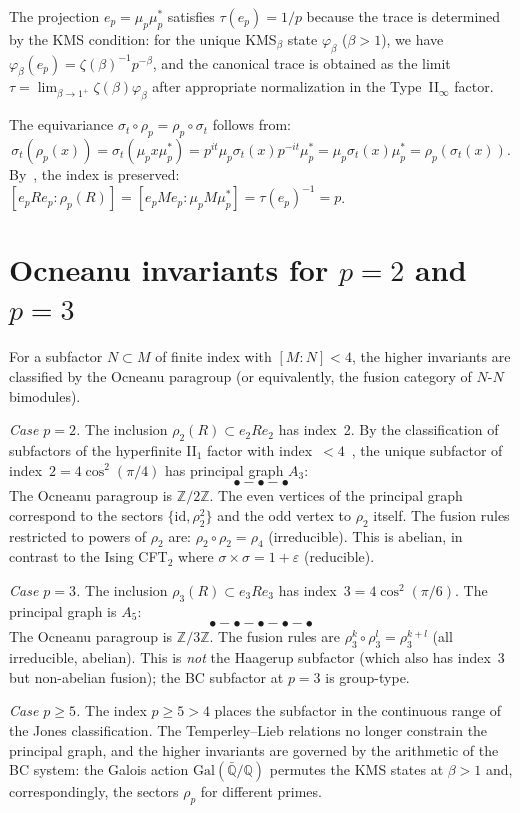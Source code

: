 \documentclass[aps,prl,twocolumn,superscriptaddress,showpacs]{revtex4-2}
\begin{document}
The projection $e_p = \mu_p \mu_p^*$ satisfies $\tau(e_p) = 1/p$ because the trace is determined by the KMS condition: for the unique KMS$_\beta$ state $\varphi_\beta$ ($\beta > 1$), we have $\varphi_\beta(e_p) = \zeta(\beta)^{-1}p^{-\beta}$, and the canonical trace is obtained as the limit $\tau = \lim_{\beta \to 1^+} \zeta(\beta)\varphi_\beta$ after appropriate normalization in the Type~II$_\infty$ factor.

The equivariance $\sigma_t \circ \rho_p = \rho_p \circ \sigma_t$ follows from:
\[
\sigma_t(\rho_p(x)) = \sigma_t(\mu_p x \mu_p^*) = p^{it}\mu_p \sigma_t(x) p^{-it}\mu_p^* = \mu_p \sigma_t(x) \mu_p^* = \rho_p(\sigma_t(x)).
\]
By~\cite[Prop.~4.2]{Longo1989}, the index is preserved: $[e_p R e_p : \rho_p(R)] = [e_p M e_p : \mu_p M \mu_p^*] = \tau(e_p)^{-1} = p$.

\section{Ocneanu invariants for $p=2$ and $p=3$}
\label{app:ocneanu}

For a subfactor $N \subset M$ of finite index with $[M{:}N] < 4$, the higher invariants are classified by the Ocneanu paragroup (or equivalently, the fusion category of $N$-$N$ bimodules).

\textit{Case $p=2$.} The inclusion $\rho_2(R) \subset e_2 R e_2$ has index~2. By the classification of subfactors of the hyperfinite II$_1$ factor with index~$< 4$~\cite{Jones1983,Ocneanu1988}, the unique subfactor of index~$2 = 4\cos^2(\pi/4)$ has principal graph $A_3$:
\[
\bullet - \bullet - \bullet
\]
The Ocneanu paragroup is $\mathbb{Z}/2\mathbb{Z}$. The even vertices of the principal graph correspond to the sectors $\{\mathrm{id}, \rho_2^2\}$ and the odd vertex to $\rho_2$ itself. The fusion rules restricted to powers of $\rho_2$ are: $\rho_2 \circ \rho_2 = \rho_4$ (irreducible). This is abelian, in contrast to the Ising CFT$_2$ where $\sigma \times \sigma = 1 + \varepsilon$ (reducible).

\textit{Case $p=3$.} The inclusion $\rho_3(R) \subset e_3 R e_3$ has index~$3 = 4\cos^2(\pi/6)$. The principal graph is $A_5$:
\[
\bullet - \bullet - \bullet - \bullet - \bullet
\]
The Ocneanu paragroup is $\mathbb{Z}/3\mathbb{Z}$. The fusion rules are $\rho_3^k \circ \rho_3^l = \rho_3^{k+l}$ (all irreducible, abelian). This is \textit{not} the Haagerup subfactor (which also has index~3 but non-abelian fusion); the BC subfactor at $p=3$ is group-type.

\textit{Case $p \geq 5$.} The index $p \geq 5 > 4$ places the subfactor in the continuous range of the Jones classification. The Temperley--Lieb relations no longer constrain the principal graph, and the higher invariants are governed by the arithmetic of the BC system: the Galois action $\mathrm{Gal}(\bar{\mathbb{Q}}/\mathbb{Q})$ permutes the KMS states at $\beta > 1$ and, correspondingly, the sectors $\rho_p$ for different primes.
\end{document}

